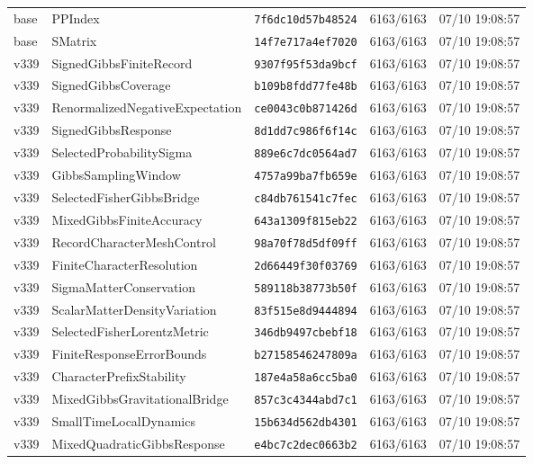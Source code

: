 \documentclass[11pt]{article}
\theoremstyle{definition}\newtheorem{deriv}{Derivation}
\begin{document}
{\begin{longtable}{@{}lllll@{}}
base & PPIndex & \texttt{7f6dc10d57b48524} & 6163/6163 & 07/10 19:08:57 \\
base & SMatrix & \texttt{14f7e717a4ef7020} & 6163/6163 & 07/10 19:08:57 \\
v339 & SignedGibbsFiniteRecord & \texttt{9307f95f53da9bcf} & 6163/6163 & 07/10 19:08:57 \\
v339 & SignedGibbsCoverage & \texttt{b109b8fdd77fe48b} & 6163/6163 & 07/10 19:08:57 \\
v339 & RenormalizedNegativeExpectation & \texttt{ce0043c0b871426d} & 6163/6163 & 07/10 19:08:57 \\
v339 & SignedGibbsResponse & \texttt{8d1dd7c986f6f14c} & 6163/6163 & 07/10 19:08:57 \\
v339 & SelectedProbabilitySigma & \texttt{889e6c7dc0564ad7} & 6163/6163 & 07/10 19:08:57 \\
v339 & GibbsSamplingWindow & \texttt{4757a99ba7fb659e} & 6163/6163 & 07/10 19:08:57 \\
v339 & SelectedFisherGibbsBridge & \texttt{c84db761541c7fec} & 6163/6163 & 07/10 19:08:57 \\
v339 & MixedGibbsFiniteAccuracy & \texttt{643a1309f815eb22} & 6163/6163 & 07/10 19:08:57 \\
v339 & RecordCharacterMeshControl & \texttt{98a70f78d5df09ff} & 6163/6163 & 07/10 19:08:57 \\
v339 & FiniteCharacterResolution & \texttt{2d66449f30f03769} & 6163/6163 & 07/10 19:08:57 \\
v339 & SigmaMatterConservation & \texttt{589118b38773b50f} & 6163/6163 & 07/10 19:08:57 \\
v339 & ScalarMatterDensityVariation & \texttt{83f515e8d9444894} & 6163/6163 & 07/10 19:08:57 \\
v339 & SelectedFisherLorentzMetric & \texttt{346db9497cbebf18} & 6163/6163 & 07/10 19:08:57 \\
v339 & FiniteResponseErrorBounds & \texttt{b27158546247809a} & 6163/6163 & 07/10 19:08:57 \\
v339 & CharacterPrefixStability & \texttt{187e4a58a6cc5ba0} & 6163/6163 & 07/10 19:08:57 \\
v339 & MixedGibbsGravitationalBridge & \texttt{857c3c4344abd7c1} & 6163/6163 & 07/10 19:08:57 \\
v339 & SmallTimeLocalDynamics & \texttt{15b634d562db4301} & 6163/6163 & 07/10 19:08:57 \\
v339 & MixedQuadraticGibbsResponse & \texttt{e4bc7c2dec0663b2} & 6163/6163 & 07/10 19:08:57 \\

\end{longtable}}
\end{document}
